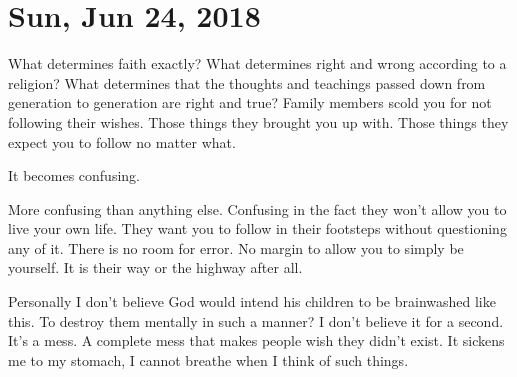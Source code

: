 \section{Sun, Jun 24, 2018}

What determines faith exactly? What determines right and wrong according to a
religion? What determines that the thoughts and teachings passed down from
generation to generation are right and true? Family members scold you for not
following their wishes. Those things they brought you up with. Those things they
expect you to follow no matter what.

It becomes confusing.

More confusing than anything else. Confusing in the fact they won't allow you to
live your own life. They want you to follow in their footsteps without
questioning any of it. There is no room for error. No margin to allow you to
simply be yourself. It is their way or the highway after all.

Personally I don't believe God would intend his children to be brainwashed like
this. To destroy them mentally in such a manner? I don't believe it for a
second. It's a mess. A complete mess that makes people wish they didn't exist.
It sickens me to my stomach, I cannot breathe when I think of such things.

